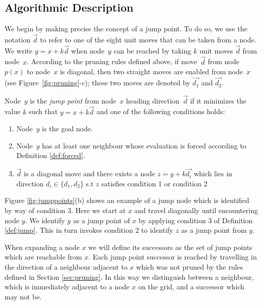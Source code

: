 \subsection{Algorithmic Description}
We begin by making precise the concept of a jump point.  
To do so, we use the notation $\vec{d}$ 
to refer to one of the eight unit moves that can be taken from a node.  
We write $y = x + k \vec{d}$ when node~$y$ can be reached 
by taking $k$ unit moves $\vec{d}$ from node~$x$.  
According to the pruning rules defined above, 
if move~$\vec{d}$ from node~$p(x)$ to node~$x$ is diagonal, 
then two straight moves are enabled from node~$x$ 
(see Figure~\ref{fig:pruning}-c); 
these two moves are denoted by $\vec{d_1}$ and $\vec{d_2}$.  

\begin{definition}
\label{def:jump}
Node~$y$ is the \emph{jump point} from node~$x$ heading direction~$\vec{d}$ 
if it minimizes the value $k$ such that $y = x + k \vec{d}$ and one of the following conditions holds: 
\begin{enumerate}
\item{Node~$y$ is the goal node.}
\item{Node~$y$ has at least one neighbour whose evaluation is forced according 
to Definition \ref{def:forced}.}
\item{$\vec{d}$ is a diagonal move and there exists 
a node $z = y + k \vec{d_{i}}$ which lies in direction $d_i \in \{d_1,d_2\}$ s.t
$z$ satisfies condition 1 or condition 2 }
\end{enumerate}
\end{definition}

Figure \ref{fig:jumppoints}(b) shows an example of a jump node which is
identified by way of condition 3.
Here we start at $x$ and travel diagonally until encountering node $y$. 
We identify $y$ as a jump point of $x$ by applying condition 3 of 
Definition \ref{def:jump}. This in turn invokes condition 2 to identify $z$ 
as a jump point from $y$.

When expanding a node $x$ we will define its successors as the set of jump
points which are reachable from $x$.  Each jump point successor is reached by
travelling in the direction of a neighbour adjacent to $x$ which was not pruned
by the rules defined in Section \ref{sec:pruning}.  In this way we distinguish
between a neighbour, which is immediately adjacent to a node $x$ on the grid,
and a successor which may not be.



